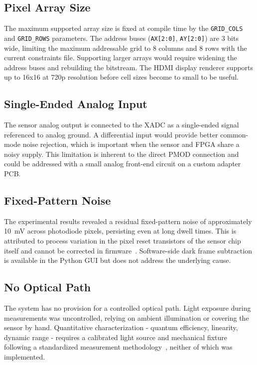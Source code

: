 \subsection{Pixel Array Size}

The maximum supported array size is fixed at compile time by the \texttt{GRID\_COLS} and \texttt{GRID\_ROWS} parameters. The address buses (\texttt{AX[2:0]}, \texttt{AY[2:0]}) are 3 bits wide, limiting the maximum addressable grid to 8 columns and 8 rows with the current constraints file. Supporting larger arrays would require widening the address buses and rebuilding the bitstream. The HDMI display renderer supports up to 16x16 at 720p resolution before cell sizes become to small to be useful.

\subsection{Single-Ended Analog Input}

The sensor analog output is connected to the XADC as a single-ended signal referenced to analog ground. A differential input would provide better common-mode noise rejection, which is important when the sensor and FPGA share a noisy supply. This limitation is inherent to the direct PMOD connection and could be addressed with a small analog front-end circuit on a custom adapter PCB.

\subsection{Fixed-Pattern Noise}

The experimental results revealed a residual fixed-pattern noise of approximately 10~mV across photodiode pixels, persisting even at long dwell times. This is attributed to process variation in the pixel reset transistors of the sensor chip itself and cannot be corrected in firmware~\cite{nakamura2005}. Software-side dark frame subtraction is available in the Python GUI but does not address the underlying cause.

\subsection{No Optical Path}

The system has no provision for a controlled optical path. Light exposure during measurements was uncontrolled, relying on ambient illumination or covering the sensor by hand. Quantitative characterization - quantum efficiency, linearity, dynamic range - requires a calibrated light source and mechanical fixture following a standardized measurement methodology~\cite{emva1288}, neither of which was implemented.

